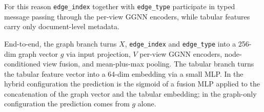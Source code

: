 \documentclass[11pt]{article}
\begin{document}
For this reason \texttt{edge\_index} together with \texttt{edge\_type}
participate in typed message passing through the per-view GGNN
encoders, while tabular features carry only document-level metadata.

End-to-end, the graph branch turns $X$, \texttt{edge\_index} and
\texttt{edge\_type} into a 256-dim graph vector $g$ via input
projection, $V$ per-view GGNN encoders, node-conditioned view fusion,
and mean-plus-max pooling. The tabular branch turns the tabular
feature vector into a 64-dim embedding via a small MLP. In the hybrid
configuration the prediction is the sigmoid of a fusion MLP applied
to the concatenation of the graph vector and the tabular embedding;
in the graph-only configuration the prediction comes from $g$ alone.
\end{document}
